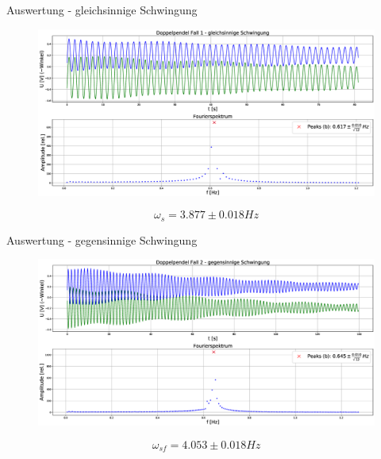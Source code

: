 \documentclass[12pt]{beamer}
\begin{document}
\begin{frame}{Auswertung - gleichsinnige Schwingung}
\begin{figure}[t]
	\centering
	\includegraphics[width=1\textwidth,height=0.7\textheight]{Doppelpendel1.eps}
\end{figure}
\begin{equation*}
\omega_s = 3.877 \pm 0.018 Hz
\end{equation*}
\end{frame}

\begin{frame}{Auswertung - gegensinnige Schwingung}
\begin{figure}[t]
	\centering
	\includegraphics[width=1\textwidth,height=0.7\textheight]{Doppelpendel2.eps}
\end{figure}
\begin{equation*}
\omega_{sf} = 4.053 \pm 0.018 Hz
\end{equation*}
\end{frame}
\end{document}
